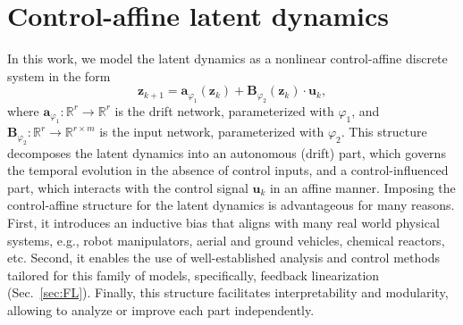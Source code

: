 \documentclass{article}
\begin{document}
\section{Control-affine latent dynamics}
\label{sec:control-affine}
In this work, we model the latent dynamics as a nonlinear control-affine discrete system in the form
\begin{equation}
    \label{eq:latent-affine}
    \mathbf{z}_{k+1} = \mathbf{a}_{\varphi_1}(\mathbf{z}_k) + \mathbf{B}_{\varphi_2}(\mathbf{z}_k)\cdot \mathbf{u}_k,
\end{equation}
where $\mathbf{a}_{\varphi_1}:\mathbb{R}^r \rightarrow \mathbb{R}^r$ is the drift network, parameterized with $\varphi_1$, and $\mathbf{B}_{\varphi_2}:\mathbb{R}^r \rightarrow\mathbb{R}^{r \times m}$ is the input network, parameterized with $\varphi_2$.
This structure decomposes the latent dynamics into an autonomous (drift) part, which governs the temporal evolution in the absence of control inputs, and a control-influenced part, which interacts with the control signal $\mathbf{u}_k$ in an affine manner.
Imposing the control-affine structure for the latent dynamics is advantageous for many reasons.
First, it introduces an inductive bias that aligns with many real world physical systems, e.g., robot manipulators, aerial and ground vehicles, chemical reactors, etc. 
Second, it enables the use of well-established analysis and control methods tailored for this family of models, specifically, feedback linearization (Sec.~\ref{sec:FL}).
Finally, this structure facilitates interpretability and modularity, allowing to analyze or improve each part independently.
\end{document}
